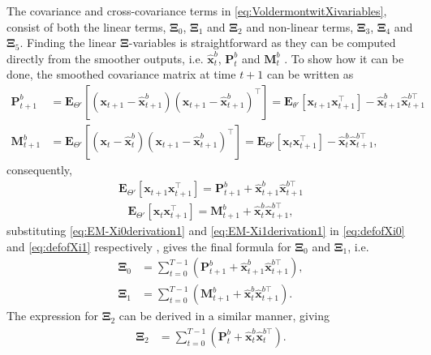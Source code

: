 \documentclass[]{article}
\begin{document}
The covariance and cross-covariance terms in \eqref{eq:VoldermontwitXivariables}, consist of both the linear terms, $\boldsymbol\Xi_0$, $\boldsymbol\Xi_1$ and $\boldsymbol\Xi_2$ and non-linear terms, $\boldsymbol\Xi_3$, $\boldsymbol\Xi_4$ and  $\boldsymbol\Xi_5$. Finding the linear $\boldsymbol\Xi$-variables is straightforward as they can be computed directly from the smoother outputs, i.e. $\hat{\mathbf x}_t^b $, $\mathbf P_t^b$ and $\mathbf M_t^b$ \cite{Gibsona2005}. To show how it can be done, the smoothed covariance matrix at time $t+1$ can be written as
\begin{align}
 \mathbf P_{t+1}^b&=\mathbf E_{\Theta'}\left[(\mathbf x_{t+1}-\mathbf{\hat x}_{t+1}^b)(\mathbf x_{t+1}-\mathbf{\hat x}_{t+1}^b)^{\top}\right]=\mathbf E_{\theta'}\left[\mathbf x_{t+1}\mathbf x_{t+1}^\top\right]-\mathbf {\hat x}_{t+1}^b\mathbf{\hat x}_{t+1}^{b\top}\label{eq:EM-PrimeryXi0derivation1}\\
 \mathbf M_{t+1}^b&=\mathbf E_{\Theta'}\left[(\mathbf x_t-\mathbf{\hat x}_t^b)(\mathbf x_{t+1}-\mathbf{\hat x}_{t+1}^b)^{\top}\right]= \mathbf E_{\Theta'}\left[\mathbf x_t\mathbf x_{t+1}^\top\right]-\mathbf {\hat x}_t^b\mathbf{\hat x}_{t+1}^{b\top},\label{eq:EM-PrimeryXi1derivation1}
\end{align}
consequently,
\begin{align}\label{eq:EM-Xi0derivation1}
 \mathbf E_{\Theta'}\left[\mathbf x_{t+1}\mathbf x_{t+1}^\top\right]=\mathbf P_{t+1}^b+\mathbf {\hat x}_{t+1}^b\mathbf{\hat x}_{t+1}^{b\top}
\end{align}
\begin{align}
 \mathbf E_{\Theta'}\left[\mathbf x_t\mathbf x_{t+1}^\top\right]=\mathbf M_{t+1}^b+\mathbf {\hat x}_t^b\mathbf{\hat x}_{t+1}^{b\top}\label{eq:EM-Xi1derivation1},
\end{align}
substituting \eqref{eq:EM-Xi0derivation1} and \eqref{eq:EM-Xi1derivation1} in \eqref{eq:defofXi0} and \eqref{eq:defofXi1} respectively , gives the final formula for $\boldsymbol\Xi_{0}$ and $\boldsymbol\Xi_{1}$, i.e.
\begin{align}
	\boldsymbol\Xi_{0}&=\sum_{t=0}^{T-1}\left(\mathbf P_{t+1}^b+\mathbf{\hat x}_{t+1}^b\mathbf{\hat x}_{t+1}^{b\top}\right)\label{eq:Xi0Gibson}, \\
\boldsymbol\Xi_{1}&=\sum_{t=0}^{T-1}\left(\mathbf M_{t+1}^b+\mathbf{\hat x}_t^b\mathbf{\hat x}_{t+1}^{b\top}\right) \label{eq:Xi1Gibson}.
\end{align}
The expression for $\boldsymbol\Xi_{2}$ can be derived in a similar manner, giving
\begin{align}
\boldsymbol\Xi_{2}&=\sum_{t=0}^{T-1}\left(\mathbf P_t^b+\mathbf{\hat x}_t^b\mathbf{\hat x}_t^{b\top}\right).\label{eq:Xi2Gibson}
\end{align}
\end{document}
